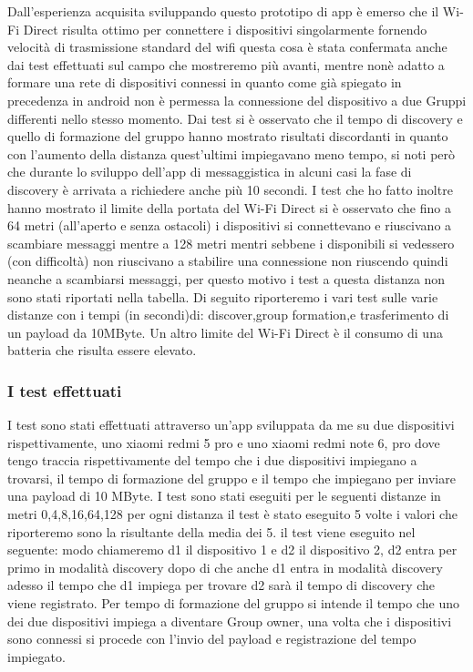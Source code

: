 Dall'esperienza acquisita sviluppando questo prototipo di app è emerso
che il Wi-Fi Direct risulta ottimo per connettere i dispositivi singolarmente
fornendo velocità di trasmissione standard del wifi questa cosa è stata confermata
anche dai test effettuati sul campo che mostreremo più avanti,
mentre nonè adatto a formare una rete di dispositivi connessi in quanto
come già spiegato in precedenza in android non è permessa la connessione
del dispositivo a due Gruppi differenti nello stesso momento.
Dai test si è osservato che il tempo di discovery e quello di formazione del gruppo
hanno mostrato risultati discordanti in quanto con l'aumento della distanza quest'ultimi
impiegavano meno tempo, si noti però che durante lo sviluppo dell'app di messaggistica
in alcuni casi la fase di discovery è arrivata a richiedere anche più 10 secondi.
I test che ho fatto inoltre hanno mostrato il limite della portata
del Wi-Fi Direct si è osservato che fino a 64 metri
(all'aperto e senza ostacoli) i dispositivi
si connettevano e riuscivano a scambiare messaggi  mentre a 128 metri
mentri sebbene i disponibili si vedessero (con difficoltà) non riuscivano
a stabilire una connessione non riuscendo quindi neanche a scambiarsi messaggi,
per questo motivo i test a questa distanza non sono stati riportati nella tabella.
Di seguito riporteremo i vari test sulle varie distanze con i tempi (in secondi)di:
discover,group formation,e trasferimento di un payload da 10MByte.
Un altro limite del Wi-Fi Direct è il consumo di una batteria che risulta
essere elevato.

\subsubsection{I test effettuati}
I test sono stati effettuati attraverso un'app sviluppata da me
su due dispositivi rispettivamente,
uno xiaomi redmi 5 pro e uno xiaomi redmi note 6, pro dove tengo
traccia rispettivamente del tempo che i due dispositivi impiegano a
trovarsi, il tempo di formazione del gruppo e il tempo che impiegano
per inviare una payload di 10 MByte.
I test sono stati eseguiti per le seguenti distanze in metri 0,4,8,16,64,128
per ogni distanza il test è stato eseguito 5 volte
i valori che riporteremo sono la risultante della media dei 5.
il test viene eseguito nel seguente: modo chiameremo d1 il dispositivo 1
e d2 il dispositivo 2,
d2 entra per primo in modalità discovery dopo di che anche d1 entra in modalità
discovery adesso il tempo che d1 impiega per trovare d2 sarà il tempo
di discovery che viene registrato. Per tempo di formazione del
gruppo si intende il tempo che uno dei due dispositivi impiega a
diventare Group owner, una volta che i dispositivi sono connessi
si procede con l'invio del payload e registrazione del tempo impiegato.

